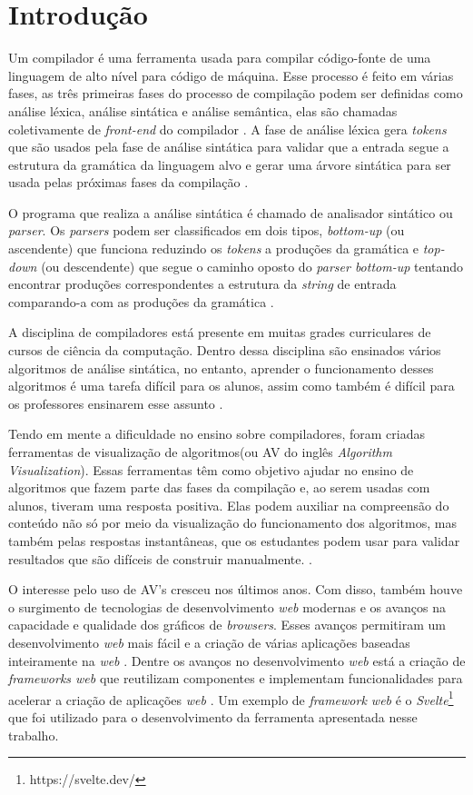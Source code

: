 \chapter{Introdução}
\label{cap:introducao}

Um compilador é uma ferramenta usada para compilar código-fonte de uma linguagem de alto nível para código de máquina. Esse processo é feito em várias fases, as três primeiras fases do processo de compilação podem ser definidas como análise léxica, análise sintática e análise semântica, elas são chamadas coletivamente de \textit{front-end} do compilador \cite{mogensen2024introduction}. A fase de análise léxica gera \textit{tokens} que são usados pela fase de análise sintática para validar que a entrada segue a estrutura da gramática da linguagem alvo e gerar uma árvore sintática para ser usada pelas próximas fases da compilação \cite{thain2020introduction}.
 
O programa que realiza a análise sintática é chamado de analisador sintático ou \textit{parser}. Os \textit{parsers} podem ser classificados em dois tipos, \textit{bottom-up} (ou ascendente) que funciona reduzindo os \textit{tokens} a produções da gramática e \textit{top-down} (ou descendente) que segue o caminho oposto do \textit{parser bottom-up} tentando encontrar produções correspondentes a estrutura da \textit{string} de entrada comparando-a com as produções da gramática \cite{cooper2022engineering}.

A disciplina de compiladores está presente em muitas grades curriculares de cursos de ciência da computação. Dentro dessa disciplina são ensinados vários algoritmos de análise sintática, no entanto, aprender o funcionamento desses algoritmos é uma tarefa difícil para os alunos, assim como também é difícil para os professores ensinarem esse assunto \cite{sangal2018pavt}.

Tendo em mente a dificuldade no ensino sobre compiladores, foram criadas ferramentas de visualização de algoritmos(ou AV do inglês \textit{Algorithm Visualization}). Essas ferramentas têm como objetivo ajudar no ensino de algoritmos que fazem parte das fases da compilação e, ao serem usadas com alunos, tiveram uma resposta positiva. Elas podem auxiliar na compreensão do conteúdo não só por meio da visualização do funcionamento dos algoritmos, mas também pelas respostas instantâneas, que os estudantes podem usar para validar resultados que são difíceis de construir manualmente. \cite{10.1145/3002136}.

O interesse pelo uso de AV's cresceu nos últimos anos. Com disso, também houve o surgimento de tecnologias de desenvolvimento \textit{web} modernas e os avanços na capacidade e qualidade dos gráficos de \textit{browsers}. Esses avanços permitiram um desenvolvimento \textit{web} mais fácil e a criação de várias aplicações baseadas inteiramente na \textit{web} \cite{effectiveav}. Dentre os avanços no desenvolvimento \textit{web} está a criação de \textit{frameworks web} que reutilizam componentes e implementam funcionalidades para acelerar a criação de aplicações \textit{web} \cite{uppal2022}. Um exemplo de \textit{framework web} é o \textit{Svelte}\footnote{https://svelte.dev/} que foi utilizado para o desenvolvimento da ferramenta apresentada nesse trabalho.

